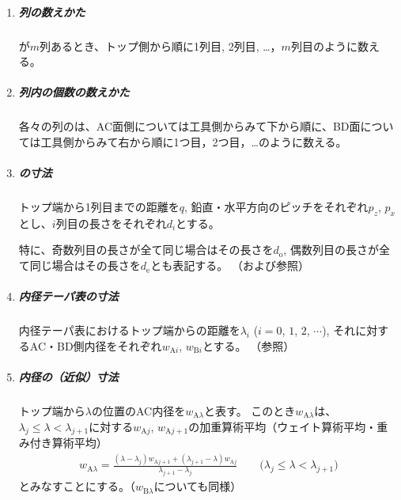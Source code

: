 \begin{tcolorbox}[title={\Dimple に関する表記法}, fonttitle=\gtfamily\bfseries, breakable, enhanced jigsaw]
\begin{enumerate}[label=\sarrow]
\item
\subparagraph*{列の数えかた}
\Dimple が$m$列あるとき、トップ側から順に1列目, 2列目, …，$m$列目のように数える。

\item
\subparagraph*{列内の個数の数えかた}
各々の列の\DimpleNum は、AC面側については工具側からみて下から順に、BD面については工具側からみて右から順に1つ目，2つ目，…のように数える。

\item
\subparagraph*{\Dimple の寸法}
トップ端から1列目までの距離を$q$, 鉛直・水平方向のピッチをそれぞれ$p_z$, $p_x$とし、$i$列目の長さをそれぞれ$d_i$とする。

特に、奇数列目の長さが全て同じ場合はその長さを$d_\mathrm o$, 偶数列目の長さが全て同じ場合はその長さを$d_\mathrm e$とも表記する。
（および参照）

\item
\subparagraph*{内径テーパ表の寸法}
内径テーパ表におけるトップ端からの距離を$\lambda_i$ ($i = 0$, $1$, $2$, $\cdots$), それに対するAC・BD側内径をそれぞれ$w_{\mathrm Ai}$, $w_{\mathrm Bi}$とする。
（参照）

\item
\subparagraph*{内径の（近似）寸法}
トップ端から$\lambda$の位置のAC内径を$w_{\mathrm A\lambda}$と表す。
このとき$w_{\mathrm A\lambda}$は、$\lambda_j \leq \lambda < \lambda_{j+1}$に対する$w_{\mathrm Aj}$, $w_{\mathrm Aj+1}$の加重算術平均（ウェイト算術平均・重み付き算術平均）
\begin{align*}
  w_{\mathrm A\lambda}
  = \frac{(\lambda-\lambda_j)w_{\mathrm Aj+1}+(\lambda_{j+1}-\lambda)w_{\mathrm Aj}}{\lambda_{j+1}-\lambda_j}
  \qquad
  \Big(\lambda_j \leq \lambda < \lambda_{j+1}\Big)
\end{align*}
とみなすことにする。（$w_{\mathrm B\lambda}$についても同様）


\end{enumerate}
\end{tcolorbox}
